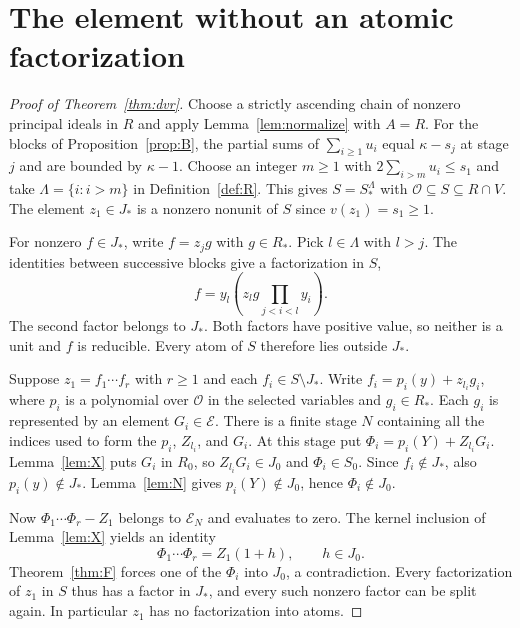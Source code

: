 \documentclass[11pt, letterpaper]{article}
\theoremstyle{definition}
\theoremstyle{remark}
\begin{document}
\section{The element without an atomic factorization}
\label{sec:witness}

\begin{proof}[Proof of Theorem~\ref{thm:dvr}]
    Choose a strictly ascending chain of nonzero principal ideals in $R$ and apply Lemma~\ref{lem:normalize} with $A = R$.
    For the blocks of Proposition~\ref{prop:B}, the partial sums of $\sum_{i \ge 1}u_i$ equal $\kappa - s_j$ at stage $j$ and are bounded by $\kappa - 1$.
    Choose an integer $m \ge 1$ with $2\sum_{i > m}u_i \le s_1$ and take $\Lambda = \{i : i > m\}$ in Definition~\ref{def:R}.
    This gives $S = S_{*}^{\Lambda}$ with $\mathcal{O} \subseteq S \subseteq R \cap V$.
    The element $z_1 \in J_{*}$ is a nonzero nonunit of $S$ since $v(z_1) = s_1 \ge 1$.

    For nonzero $f \in J_{*}$, write $f = z_j g$ with $g \in R_{*}$.
    Pick $l \in \Lambda$ with $l > j$.
    The identities between successive blocks give a factorization in $S$,
    \[
        f = y_l \left(z_l g\prod_{j < i < l} y_i\right).
    \]
    The second factor belongs to $J_{*}$.
    Both factors have positive value, so neither is a unit and $f$ is reducible.
    Every atom of $S$ therefore lies outside $J_{*}$.

    Suppose $z_1 = f_1 \cdots f_r$ with $r \ge 1$ and each $f_i \in S \setminus J_{*}$.
    Write $f_i = p_i(y) + z_{l_i} g_i$, where $p_i$ is a polynomial over $\mathcal{O}$ in the selected variables and $g_i \in R_{*}$.
    Each $g_i$ is represented by an element $G_i \in \mathcal{E}$.
    There is a finite stage $N$ containing all the indices used to form the $p_i$, $Z_{l_i}$, and $G_i$.
    At this stage put $\Phi_i = p_i(Y) + Z_{l_i} G_i$.
    Lemma~\ref{lem:X} puts $G_i$ in $R_{0}$, so $Z_{l_i} G_i \in J_{0}$ and $\Phi_i \in S_{0}$.
    Since $f_i \notin J_{*}$, also $p_i(y) \notin J_{*}$.
    Lemma~\ref{lem:N} gives $p_i(Y) \notin J_{0}$, hence $\Phi_i \notin J_{0}$.

    Now $\Phi_1 \cdots \Phi_r - Z_1$ belongs to $\mathcal{E}_{N}$ and evaluates to zero.
    The kernel inclusion of Lemma~\ref{lem:X} yields an identity
    \[
        \Phi_1 \cdots \Phi_r = Z_1(1 + h), \qquad h \in J_{0}.
    \]
    Theorem~\ref{thm:F} forces one of the $\Phi_i$ into $J_{0}$, a contradiction.
    Every factorization of $z_1$ in $S$ thus has a factor in $J_{*}$, and every such nonzero factor can be split again.
    In particular $z_1$ has no factorization into atoms.
\end{proof}
\end{document}
